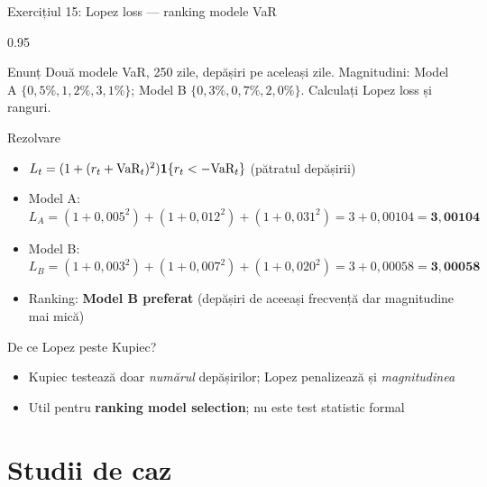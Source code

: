 \documentclass[9pt, aspectratio=169, t]{beamer}
\begin{document}
\begin{frame}[shrink=10]{Exercițiul 15: Lopez loss --- ranking modele VaR}
    \begin{cminipage}{0.95\textwidth}
    \begin{block}{Enunț}
    Două modele VaR, 250 zile, depășiri pe aceleași zile. Magnitudini: Model A $\{0{,}5\%, 1{,}2\%, 3{,}1\%\}$; Model B $\{0{,}3\%, 0{,}7\%, 2{,}0\%\}$. Calculați Lopez loss și ranguri.
    \end{block}
    \begin{exampleblock}{Rezolvare}
    \begin{itemize}\setlength{\itemsep}{0pt}
        \item $L_t = (1 + (r_t + \text{VaR}_t)^2)\mathbf{1}\{r_t < -\text{VaR}_t\}$ (pătratul depășirii)
        \item Model A: $L_A = (1+0{,}005^2) + (1+0{,}012^2) + (1+0{,}031^2) = 3 + 0{,}00104 = \mathbf{3{,}00104}$
        \item Model B: $L_B = (1+0{,}003^2) + (1+0{,}007^2) + (1+0{,}020^2) = 3 + 0{,}00058 = \mathbf{3{,}00058}$
        \item Ranking: \textbf{Model B preferat} (depășiri de aceeași frecvență dar magnitudine mai mică)
    \end{itemize}
    \end{exampleblock}
    \begin{alertblock}{De ce Lopez peste Kupiec?}
    \begin{itemize}\setlength{\itemsep}{0pt}
        \item Kupiec testează doar \emph{numărul} depășirilor; Lopez penalizează și \emph{magnitudinea}
        \item Util pentru \textbf{ranking model selection}; nu este test statistic formal
    \end{itemize}
    \end{alertblock}
    \end{cminipage}
\end{frame}

\section{Studii de caz}
\end{document}
